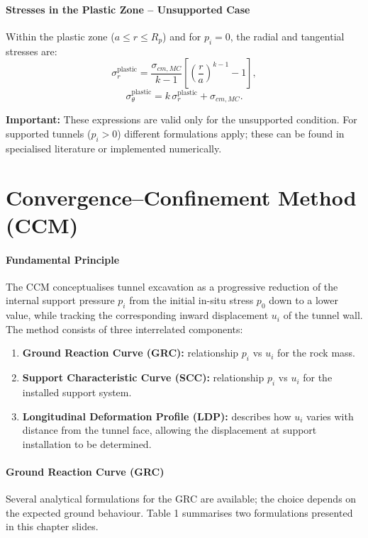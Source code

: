 \paragraph{Stresses in the Plastic Zone -- Unsupported Case}
Within the plastic zone ($a \leq r \leq R_p$) and for $p_i = 0$, the radial and tangential stresses are:
\[
\sigma_r^{\text{plastic}} = \frac{\sigma_{cm,MC}}{k - 1}\left[\left(\frac{r}{a}\right)^{k-1} - 1\right],
\]
\[
\sigma_\theta^{\text{plastic}} = k\,\sigma_r^{\text{plastic}} + \sigma_{cm,MC}.
\]

\textbf{Important:} These expressions are valid only for the unsupported condition. For supported tunnels ($p_i > 0$) different formulations apply; these can be found in specialised literature or implemented numerically.

\section{Convergence--Confinement Method (CCM)}

\paragraph{Fundamental Principle}
The CCM conceptualises tunnel excavation as a progressive reduction of the internal support pressure $p_i$ from the initial in-situ stress $p_0$ down to a lower value, while tracking the corresponding inward displacement $u_i$ of the tunnel wall. The method consists of three interrelated components:
\begin{enumerate}[leftmargin=*]
 \item \textbf{Ground Reaction Curve (GRC):} relationship $p_i$ vs $u_i$ for the rock mass.
 \item \textbf{Support Characteristic Curve (SCC):} relationship $p_i$ vs $u_i$ for the installed support system.
 \item \textbf{Longitudinal Deformation Profile (LDP):} describes how $u_i$ varies with distance from the tunnel face, allowing the displacement at support installation to be determined.
\end{enumerate}

\paragraph{Ground Reaction Curve (GRC)}
Several analytical formulations for the GRC are available; the choice depends on the expected ground behaviour. Table 1 summarises two formulations presented in this chapter slides.

